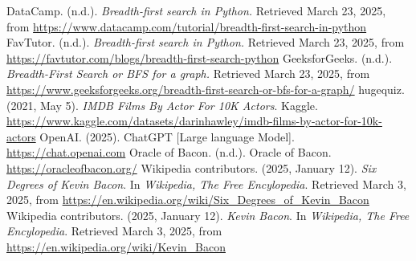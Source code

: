\documentclass{article}
\begin{document}
\begin{thebibliography}{5}
\bibitem{}
DataCamp. (n.d.). \textit{Breadth-first search in Python.} Retrieved March 23, 2025, from  \url{https://www.datacamp.com/tutorial/breadth-first-search-in-python}
\bibitem{}
FavTutor. (n.d.). \textit{Breadth-first search in Python.} Retrieved March 23, 2025, from \url{https://favtutor.com/blogs/breadth-first-search-python}
\bibitem{}
GeeksforGeeks. (n.d.). \textit{Breadth-First Search or BFS for a graph.} Retrieved March 23, 2025, from \url{https://www.geeksforgeeks.org/breadth-first-search-or-bfs-for-a-graph/}
\bibitem{}
hugequiz. (2021, May 5). \textit{IMDB Films By Actor For 10K Actors}. Kaggle. \url{https://www.kaggle.com/datasets/darinhawley/imdb-films-by-actor-for-10k-actors}
\bibitem{}
OpenAI. (2025). ChatGPT [Large language Model]. \url{https://chat.openai.com}
\bibitem{}
Oracle of Bacon. (n.d.). Oracle of Bacon. \url{https://oracleofbacon.org/}
\bibitem{}
Wikipedia contributors. (2025, January 12). \textit{Six Degrees of Kevin Bacon}. In \textit{Wikipedia, The Free Encylopedia}. Retrieved March 3, 2025, from \url{https://en.wikipedia.org/wiki/Six\_Degrees\_of\_Kevin\_Bacon}
\bibitem{}
Wikipedia contributors. (2025, January 12). \textit{Kevin Bacon}. In \textit{Wikipedia, The Free Encylopedia}. Retrieved March 3, 2025, from \url{https://en.wikipedia.org/wiki/Kevin\_Bacon}
\end{thebibliography}
\end{document}
